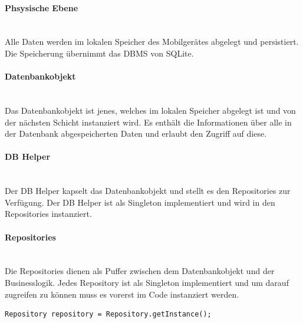 \documentclass[FIPLY_base.tex]{subfiles}
\begin{document}
\paragraph{Phsysische Ebene}\ \\
Alle Daten werden im lokalen Speicher des Mobilgerätes abgelegt und persistiert. Die Speicherung übernimmt das DBMS von SQLite.

\paragraph{Datenbankobjekt}\ \\
Das Datenbankobjekt ist jenes, welches im lokalen Speicher abgelegt ist und von der nächsten Schicht instanziert wird. Es enthält die Informationen über alle in der Datenbank abgespeicherten Daten und erlaubt den Zugriff auf diese.

\paragraph{DB Helper}\ \\
Der DB Helper kapselt das Datenbankobjekt und stellt es den Repositories zur Verfügung. Der DB Helper ist als Singleton implementiert und wird in den Repositories instanziert.

\paragraph{Repositories}\ \\
Die Repositories dienen als Puffer zwischen dem Datenbankobjekt und der Businesslogik.
Jedes Repository ist als Singleton implementiert und um darauf zugreifen zu können muss es vorerst im Code instanziert werden.
\ \\
\begin{lstlisting}[caption={Repository wird instanziert.},label=DescriptiveLabel]
Repository repository = Repository.getInstance();
\end{lstlisting}
\end{document}
